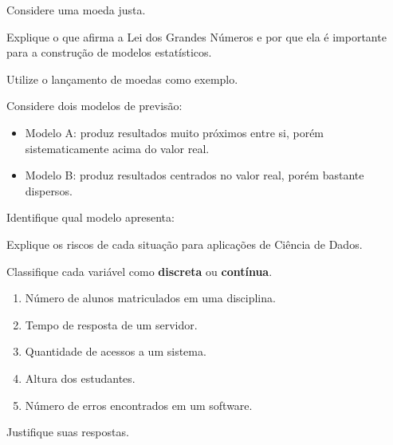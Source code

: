 \documentclass[a4paper, 12pt, addpoints]{exam}
\begin{document}
\begin{questions}
	
	
	
	\question[1]
	
	Considere uma moeda justa.
	
	Explique o que afirma a Lei dos Grandes Números e por que ela é importante para a construção de modelos estatísticos.
	
	Utilize o lançamento de moedas como exemplo.
	
	
	\question[1]
	
	Considere dois modelos de previsão:
	
	\begin{itemize}
		\item Modelo A: produz resultados muito próximos entre si, porém sistematicamente acima do valor real.
		\item Modelo B: produz resultados centrados no valor real, porém bastante dispersos.
	\end{itemize}
	
	Identifique qual modelo apresenta:
	
	
	Explique os riscos de cada situação para aplicações de Ciência de Dados.
	
	\question[1]
	
	Classifique cada variável como \textbf{discreta} ou \textbf{contínua}.
	
	\begin{enumerate}
		\item Número de alunos matriculados em uma disciplina.
		\item Tempo de resposta de um servidor.
		\item Quantidade de acessos a um sistema.
		\item Altura dos estudantes.
		\item Número de erros encontrados em um software.
	\end{enumerate}
	
	Justifique suas respostas.
	
	
	\question[1]
	

\end{questions}
\end{document}
